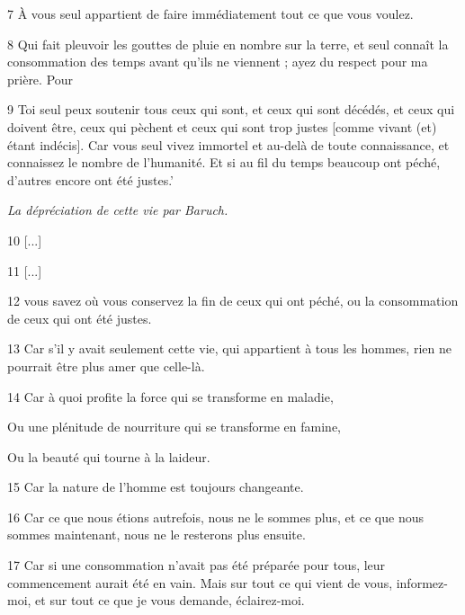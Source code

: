 \par 7 À vous seul appartient de faire immédiatement tout ce que vous voulez.

\par 8 Qui fait pleuvoir les gouttes de pluie en nombre sur la terre, et seul connaît la consommation des temps avant qu'ils ne viennent ; ayez du respect pour ma prière. Pour

\par 9 Toi seul peux soutenir tous ceux qui sont, et ceux qui sont décédés, et ceux qui doivent être, ceux qui pèchent et ceux qui sont trop justes [comme vivant (et) étant indécis]. Car vous seul vivez immortel et au-delà de toute connaissance, et connaissez le nombre de l'humanité. Et si au fil du temps beaucoup ont péché, d'autres encore ont été justes.'

\par \textit{La dépréciation de cette vie par Baruch.}

\par 10 [...]

\par 11 [...]

\par 12 vous savez où vous conservez la fin de ceux qui ont péché, ou la consommation de ceux qui ont été justes.

\par 13 Car s'il y avait seulement cette vie, qui appartient à tous les hommes, rien ne pourrait être plus amer que celle-là.

\par 14 Car à quoi profite la force qui se transforme en maladie,

\par Ou une plénitude de nourriture qui se transforme en famine,

\par Ou la beauté qui tourne à la laideur.

\par 15 Car la nature de l'homme est toujours changeante.

\par 16 Car ce que nous étions autrefois, nous ne le sommes plus, et ce que nous sommes maintenant, nous ne le resterons plus ensuite.

\par 17 Car si une consommation n'avait pas été préparée pour tous, leur commencement aurait été en vain. Mais sur tout ce qui vient de vous, informez-moi, et sur tout ce que je vous demande, éclairez-moi.

